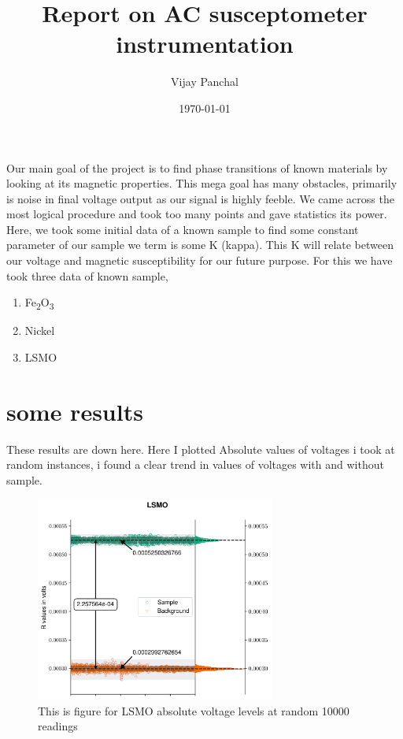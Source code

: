 \documentclass[a4paper,11pt]{article}
\author{Vijay Panchal}
\date{\today}
\title{Report on AC susceptometer instrumentation}
\begin{document}
\maketitle
Our main goal of the project is to find phase transitions of known materials by looking at its magnetic properties. This mega goal has many obstacles, primarily is noise in final voltage output as our signal is highly feeble. We came across the most logical procedure and took too many points and gave statistics its power. Here, we took some initial data of a known sample to find some constant parameter of our sample we term is some K (kappa). This K will relate between our voltage and magnetic susceptibility for our future purpose. For this we have took three data of known sample,

\begin{enumerate}
\item Fe\textsubscript{2}O\textsubscript{3}
\item Nickel
\item LSMO
\end{enumerate}

\section{some results}
\label{sec:org74fd4ca}
These results are down here. Here I plotted Absolute values of voltages i took at random instances, i found a clear trend in values of voltages with and without sample. 

\begin{figure}[!ht]\center
\includegraphics[width=0.7\textwidth]{LSMOR.png}
\caption{This is figure for LSMO absolute voltage levels at random 10000 readings}
\end{figure}
\end{document}
